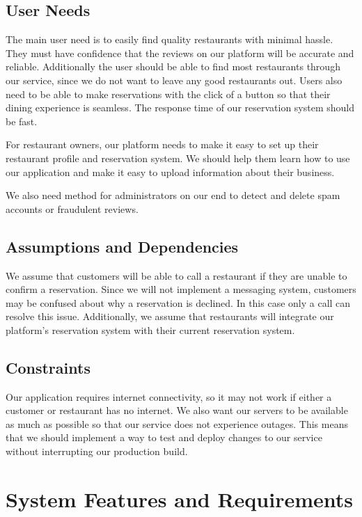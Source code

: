 \documentclass[12pt]{article}
\begin{document}
\subsection{User Needs}

The main user need is to easily find quality restaurants with minimal hassle. They must have confidence that the reviews on our
platform will be accurate and reliable. Additionally the user should be able to find most restaurants through our service, since
we do not want to leave any good restaurants out. Users also need to be able to make reservations with the click of a button so that their
dining experience is seamless. The response time of our reservation system should be fast.

For restaurant owners, our platform needs to make it easy to set up their restaurant profile and reservation system. We should
help them learn how to use our application and make it easy to upload information about their business.

We also need method for administrators on our end to detect and delete spam accounts or fraudulent reviews.

\subsection{Assumptions and Dependencies}

We assume that customers will be able to call a restaurant if they are unable to confirm a reservation. Since we will not implement
a messaging system, customers may be confused about why a reservation is declined. In this case only a call can resolve this issue.
Additionally, we assume that restaurants will integrate our platform's reservation system with their current reservation system.

\subsection{Constraints}

Our application requires internet connectivity, so it may not work if either a customer or restaurant has no internet. We also
want our servers to be available as much as possible so that our service does not experience outages. This means that we should
implement a way to test and deploy changes to our service without interrupting our production build.

\section{System Features and Requirements}
\end{document}
